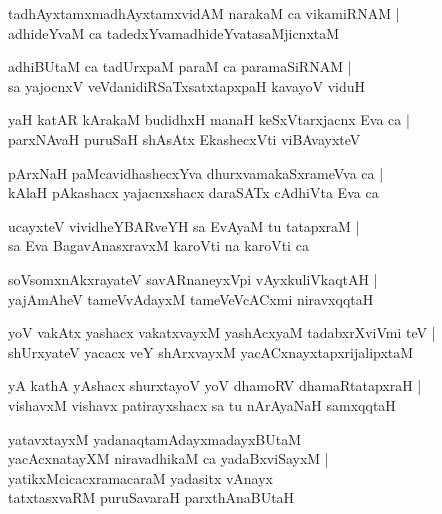 \begin{shloka}
tadhAyxtamxmadhAyxtamxvidAM narakaM ca vikamiRNAM |\\
adhideYvaM ca tadedxYvamadhideYvatasaMjicnxtaM 
\end{shloka}

\begin{shloka}
adhiBUtaM ca tadUrxpaM paraM ca paramaSiRNAM |\\
sa yajocnxV veVdanidiRSaTxsatxtapxpaH kavayoV viduH
\end{shloka}

\begin{shloka}
yaH katAR kArakaM budidhxH manaH keSxVtarxjacnx Eva ca |\\
parxNAvaH puruSaH shAsAtx EkashecxVti viBAvayxteV 
\end{shloka}

\begin{shloka}
pArxNaH paMcavidhashecxYva dhurxvamakaSxrameVva ca |\\
kAlaH pAkashacx yajacnxshacx daraSATx cAdhiVta Eva ca
\end{shloka}

\begin{shloka}
ucayxteV vividheYBARveYH sa EvAyaM tu tatapxraM |\\
sa Eva BagavAnasxravxM karoVti na karoVti ca 
\end{shloka}

\begin{shloka}
soVsomxnAkxrayateV savARnaneyxVpi vAyxkuliVkaqtAH |\\
yajAmAheV tameVvAdayxM tameVeVcACxmi niravxqqtaH 
\end{shloka}

\begin{shloka}
yoV vakAtx yashacx vakatxvayxM yashAcxyaM tadabxrXviVmi teV |\\
shUrxyateV yacacx veY shArxvayxM yacACxnayxtapxrijalipxtaM 
\end{shloka}

\begin{shloka}
yA kathA yAshacx shurxtayoV yoV dhamoRV dhamaRtatapxraH |\\
vishavxM vishavx patirayxshacx sa tu nArAyaNaH samxqqtaH 
\end{shloka}

\begin{shloka}
yatavxtayxM yadanaqtamAdayxmadayxBUtaM \\
yacAcxnatayXM niravadhikaM ca yadaBxviSayxM |\\
yatikxMcicacxramacaraM yadasitx vAnayx\\
tatxtasxvaRM puruSavaraH parxthAnaBUtaH 
\end{shloka}

